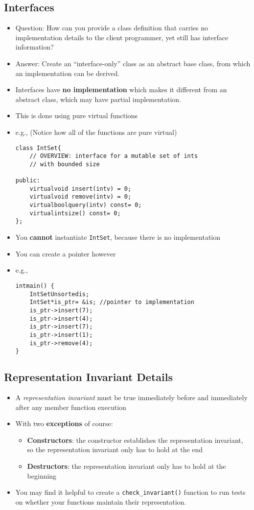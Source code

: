 \subsection{Interfaces}
\begin{itemize}
	\item Question: How can you provide a class definition that carries no implementation details to the client programmer, yet still has interface information?
	\item Answer: Create an ``interface-only'' class as an abstract base class, from which an implementation can be derived.
	\item Interfaces have \textbf{no implementation} which makes it different from an abstract class, which may have partial implementation.
	\item This is done using pure virtual functions
	\item e.g., (Notice how all of the functions are pure virtual)
\begin{lstlisting}[style=C++]
class IntSet{
	// OVERVIEW: interface for a mutable set of ints
	// with bounded size

public:
	virtualvoid insert(intv) = 0;
	virtualvoid remove(intv) = 0;
	virtualboolquery(intv) const= 0;
	virtualintsize() const= 0;
};
\end{lstlisting}
	\item You \textbf{cannot} instantiate \lstinline[style=C++]{IntSet}, because there is no implementation
	\item You can create a pointer however
	\item e.g.,
\begin{lstlisting}[style=C++]
intmain() {
	IntSetUnsortedis;
	IntSet*is_ptr= &is; //pointer to implementation
	is_ptr->insert(7);
	is_ptr->insert(4);
	is_ptr->insert(7);
	is_ptr->insert(1);
	is_ptr->remove(4);
}
\end{lstlisting}
\end{itemize}

\subsection{Representation Invariant Details}
\begin{itemize}
	\item A \textit{representation invariant} must be true immediately before and immediately after any member function execution
	\item With two \textbf{exceptions} of course:
	\begin{itemize}
		\item \textbf{Constructors}: the constructor establishes the representation invariant, so the representation invariant only has to hold at the end
		\item \textbf{Destructors}: the representation invariant only has to hold at the beginning
	\end{itemize}
	\item You may find it helpful to create a \lstinline[style=C++]{check_invariant()} function to run tests on whether your functions maintain their representation.
\end{itemize}
